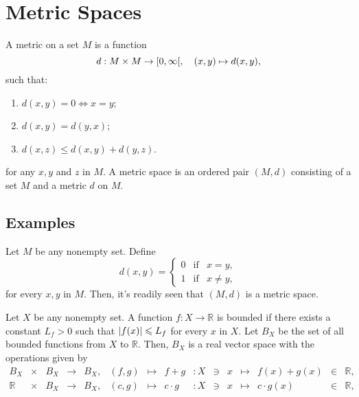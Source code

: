 \section{Metric Spaces}\label{sec:metric-spaces}

\begin{definition}\label{def:metric-space}
  A metric on a set $ M $ is a function
  \[
    d:M\times{M}\to\rinterval{0}{\infty},\quad(x,y)\mapsto{d(x,y)},
  \]
  such that:
  \begin{enumerate}
    \item
      $ d(x,y)=0\iff{x=y} $;
    \item
      $ d(x,y)=d(y,x) $;
    \item
      $ d(x,z) \leqslant d(x,y) + d(y,z) $.
  \end{enumerate}
  for any $ x,y $ and $ z $ in $ M $. A metric space is an ordered pair $ (M,d) $ consisting of a set $ M $ and a metric $ d $ on $ M $.
\end{definition}

\subsection{Examples}\label{ssec:examples}

\begin{example}\label{ex:zero-one}
  Let $ M $ be any nonempty set. Define
  \[
    d(x,y)
    =
    \left\{\begin{array}{ccc}
      0 & \text{if} & x=y, \\
      1 & \text{if} & x\neq{y},
    \end{array}\right.
  \]
  for every $ x,y $ in $ M $. Then, it's readily seen that $ (M,d) $ is a metric space.
\end{example}

\begin{example}\label{ex:bouded-functions}
  Let $ X $ be any nonempty set. A function $ f:X\to\mathbb{R} $ is bounded if there exists a constant $ L_{f} > 0 $ such that $ \lvert f(x)\rvert \leqslant L_{f} $ for every $ x $ in $ X $. Let $ B_{X} $ be the set of all bounded functions from $ X $ to $ \mathbb{R} $. Then, $ B_{X} $ is a real vector space with the operations given by
  \[
    \begin{array}{rlllllllllllcll}
      B_{X}      & \times & {B_{X}} & \to & B_{X}, & (f,g) & \mapsto & f+g       & :X & \owns & x & \mapsto & f(x)+g(x)    & \in & \mathbb{R}, \\
      \mathbb{R} & \times & {B_{X}} & \to & B_{X}, & (c,g) & \mapsto & c\cdot{g} & :X & \owns & x & \mapsto & c\cdot{g(x)} & \in & \mathbb{R},
    \end{array}
  \]
\end{example}


